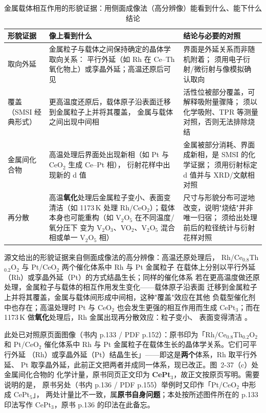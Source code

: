 \begin{table}[htbp]
\centering
\caption{金属载体相互作用的形貌证据：用侧面成像法（高分辨像）能看到什么、能下什么结论}
\label{tab:ch02b-smsi}
{\srcsize
\begin{tabularx}{\columnwidth}{@{}l X X@{}}
\toprule
形貌证据 & 像上看到什么 & 结论与必要的对照 \\
\midrule
取向外延 &
金属粒子与载体之间保持确定的晶体学取向关系：
平行外延（如 Rh 在 Ce--Th 氧化物上）或孪晶外延；高温还原后可见 &
界面是外延关系而非随机附着；
须用电子衍射/微衍射与像模拟确认取向 \\
覆盖（SMSI 经典形式） &
更高温度还原后，载体原子沿表面迁移到金属粒子上并将其覆盖，
金属与载体之间出现中间相 &
活性位被部分覆盖，可解释吸附量骤降；
须以化学吸附、TPR 等测量对照，否则无法排除烧结 \\
金属间化合物 &
高温处理后界面处出现新相（如 Pt 与 CeO$_2$ 生成 Ce--Pt 相），
衍射花样中出现新的 d 值 &
金属被部分消耗、界面成新相，是 SMSI 的化学证据；
须用衍射标定 d 值并与 XRD/文献相对照 \\
再分散 &
高温\textbf{氧化}处理后金属粒子变小、表面变清洁（如 1173\,K 处理
Rh/CeO$_2$）；载体本身也可能重构（如 V$_2$O$_5$ 在不同温度/氧分压下
变为 V$_2$O$_3$、VO$_2$、V$_2$O$_5$ 混合相或单一 V$_2$O$_5$ 相） &
尺寸与形貌分布可逆地改变，说明"烧结"并非唯一归宿；
须给出处理前后的粒径统计与衍射花样对照 \\
\bottomrule
\end{tabularx}}
\end{table}

源文给出的形貌证据来自侧面成像法的高分辨像：高温还原处理后，
Rh/Ce$_{0.8}$Th$_{0.2}$O$_2$ 与 Pt/CeO$_2$ 两个催化体系中 Rh 与 Pt 金属粒子
在载体上分别以平行外延（Rh）或孪晶外延（Pt）的方式结晶生长；同样的催化体系
若在更高温度做还原处理，金属粒子与载体的相互作用发生变化——载体原子沿表面
迁移到金属粒子上并将其覆盖，金属与载体间形成中间相，这种"覆盖"效应在其他
负载型催化剂中也存在；高温处理时 Pt 与 CeO$_2$ 也会发生更强的相互作用而生成
CePt$_3$；而在 1173\,K 做\textbf{氧化}处理后，Rh 金属出现再分散效应：粒子变小、
表面变得清洁
。

此处已对照原页面图像（书内 p.133 / PDF p.152）：原书印为「Rh/Ce$_{0.8}$Th$_{0.2}$O$_2$
和 Pt/CeO$_2$ 催化体系中 Rh 与 Pt 金属粒子在载体生长的晶体学关系。它们可平行外延
（Rh）或孪晶外延（Pt）结晶生长」——即这是\textbf{两个}体系，Rh 取平行外延、
Pt 取孪晶外延，此前正文把两者并成同一体系，现已改正。图~2-37（c）处金属间化合物的
化学计量，原书同页正文印为 \textbf{CePt$_3$}，故正文按原页写明。需要说明的是，
原书另处（书内 p.136 / PDF p.155）举例时又印作「Pt/CeO$_2$ 中形成 CePt$_5$」，
两处计量比不一致，属\textbf{原书自身问题}；本处按所述图件所在的 p.133 印法写作
CePt$_3$，原书 p.136 的印法在此备忘。

